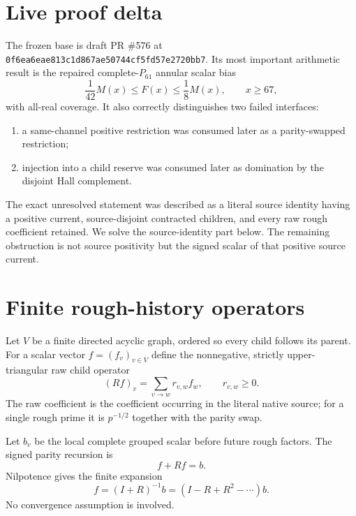 \documentclass[11pt]{article}
\newcommand{\1}{\mathbf 1}
\begin{document}
\tableofcontents

\section{Live proof delta}

The frozen base is draft PR \#576 at
\texttt{0f6ea6eae813c1d867ae50744cf5fd57e2720bb7}.  Its most important
arithmetic result is the repaired complete-$P_{61}$ annular scalar bias
\begin{equation}
 \frac1{42}M(x)\le F(x)\le\frac18M(x),\qquad x\ge67,
 \label{eq:p61bias}
\end{equation}
with all-real coverage.  It also correctly distinguishes two failed
interfaces:
\begin{enumerate}
\item a same-channel positive restriction was consumed later as a
parity-swapped restriction;
\item injection into a child reserve was consumed later as domination by the
disjoint Hall complement.
\end{enumerate}

The exact unresolved statement was described as a literal source identity
having a positive current, source-disjoint contracted children, and every raw
rough coefficient retained.  We solve the source-identity part below.  The
remaining obstruction is not source positivity but the signed scalar of that
positive source current.

\section{Finite rough-history operators}

Let $V$ be a finite directed acyclic graph, ordered so every child follows its
parent.  For a scalar vector $f=(f_v)_{v\in V}$ define the nonnegative,
strictly upper-triangular raw child operator
\[
 (Rf)_v=\sum_{v\to w}r_{v,w}f_w,
 \qquad r_{v,w}\ge0.
\]
The raw coefficient is the coefficient occurring in the literal native source;
for a single rough prime it is $p^{-1/2}$ together with the parity swap.

Let $b_v$ be the local complete grouped scalar before future rough factors.  The
signed parity recursion is
\begin{equation}
 f+Rf=b.
 \label{eq:rawrec}
\end{equation}
Nilpotence gives the finite expansion
\[
 f=(I+R)^{-1}b=(I-R+R^2-\cdots)b.
\]
No convergence assumption is involved.
\end{document}
